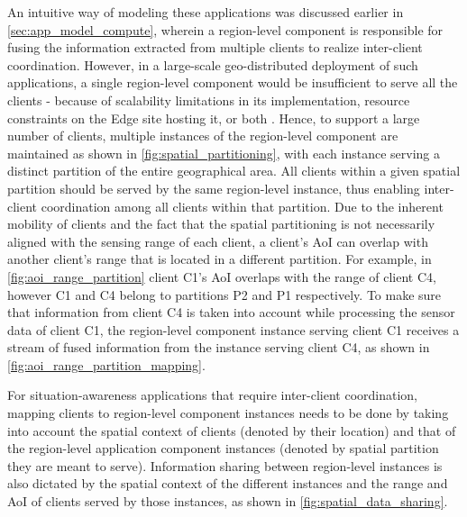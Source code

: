 An intuitive way of modeling these applications was discussed earlier in \cref{sec:app_model_compute}, wherein a region-level component is responsible for fusing the information extracted from multiple clients to realize inter-client coordination. However, in a large-scale geo-distributed deployment of such applications, a single region-level component would be insufficient to serve all the clients - because of scalability limitations in its implementation, resource constraints on the Edge site hosting it, or both \cite{talkycars}. Hence, to support a large number of clients, multiple instances of the region-level component are maintained as shown in \cref{fig:spatial_partitioning}, with each instance serving a distinct partition of the entire geographical area. All clients within a given spatial partition should be served by the same region-level instance, thus enabling inter-client coordination among all clients within that partition. Due to the inherent mobility of clients and the fact that the spatial partitioning is not necessarily aligned with the sensing range of each client, a client's AoI can overlap with another client's range that is located in a different partition. For example, in \cref{fig:aoi_range_partition} client C1's AoI overlaps with the range of client C4, however C1 and C4 belong to partitions P2 and P1 respectively. To make sure that information from client C4 is taken into account while processing the sensor data of client C1, the region-level component instance serving client C1 receives a stream of fused information from the instance serving client C4, as shown in \cref{fig:aoi_range_partition_mapping}. 

\par For situation-awareness applications that require inter-client coordination, mapping clients to region-level component instances needs to be done by taking into account the spatial context of clients (denoted by their location) and that of the region-level application component instances (denoted by spatial partition they are meant to serve). Information sharing between region-level instances is also dictated by the spatial context of the different instances and the range and AoI of clients served by those instances, as shown in \cref{fig:spatial_data_sharing}. 

